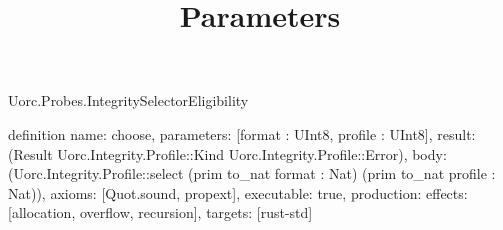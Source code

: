 \begin{lexlean}{Uorc.Probes.IntegritySelectorEligibility}
\title{Parameters}
\begin{semanticmodule}
definition{
  name: choose,
  parameters: [format : UInt8, profile : UInt8],
  result: (Result Uorc.Integrity.Profile::Kind Uorc.Integrity.Profile::Error),
  body: (Uorc.Integrity.Profile::select (prim to_nat format : Nat) (prim to_nat profile : Nat)),
  axioms: [Quot.sound, propext],
  executable: true,
  production: {effects: [allocation, overflow, recursion], targets: [rust-std]}
}
\end{semanticmodule}
\end{lexlean}
